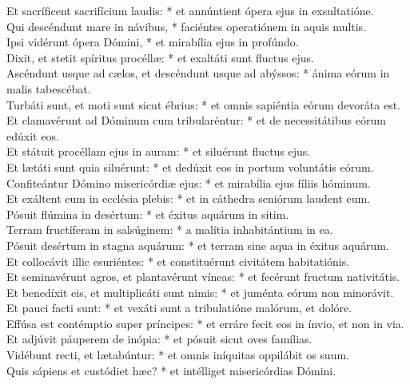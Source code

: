 {	Et sacríficent sacrifícium laudis: * et annúntient ópera ejus in exsultatióne. \\
	Qui descéndunt mare in návibus, * faciéntes operatiónem in aquis multis. \\
	Ipsi vidérunt ópera Dómini, * et mirabília ejus in profúndo. \\
	Dixit, et stetit spíritus procéllæ: * et exaltáti sunt fluctus ejus. \\
	Ascéndunt usque ad cælos, et descéndunt usque ad abýssos: * ánima eórum in malis tabescébat. \\
	Turbáti sunt, et moti sunt sicut ébrius: * et omnis sapiéntia eórum devoráta est. \\
	Et clamavérunt ad Dóminum cum tribularéntur: * et de necessitátibus eórum edúxit eos. \\
	Et státuit procéllam ejus in auram: * et siluérunt fluctus ejus. \\
	Et lætáti sunt quia siluérunt: * et dedúxit eos in portum voluntátis eórum. \\
	Confiteántur Dómino misericórdiæ ejus: * et mirabília ejus fíliis hóminum. \\
	Et exáltent eum in ecclésia plebis: * et in cáthedra seniórum laudent eum. \\
	Pósuit flúmina in desértum: * et éxitus aquárum in sitim. \\
	Terram fructíferam in salsúginem: * a malítia inhabitántium in ea. \\
	Pósuit desértum in stagna aquárum: * et terram sine aqua in éxitus aquárum. \\
	Et collocávit illic esuriéntes: * et constituérunt civitátem habitatiónis. \\
	Et seminavérunt agros, et plantavérunt víneas: * et fecérunt fructum nativitátis. \\
	Et benedíxit eis, et multiplicáti sunt nimis: * et juménta eórum non minorávit. \\
	Et pauci facti sunt: * et vexáti sunt a tribulatióne malórum, et dolóre. \\
	Effúsa est contémptio super príncipes: * et erráre fecit eos in ínvio, et non in via. \\
	Et adjúvit páuperem de inópia: * et pósuit sicut oves famílias. \\
	Vidébunt recti, et lætabúntur: * et omnis iníquitas oppilábit os suum. \\
	Quis sápiens et custódiet hæc? * et intélliget misericórdias Dómini. \\
}

